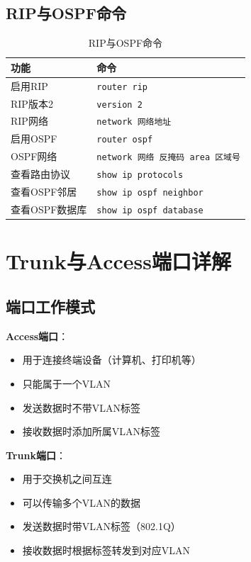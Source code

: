 \documentclass[12pt,a4paper]{ctexart}
\begin{document}
\subsection{RIP与OSPF命令}

\begin{table}[htbp]
\centering\small
\begin{tabular}{ll}
\toprule
\textbf{功能} & \textbf{命令} \\
\midrule
启用RIP & \texttt{router rip} \\
RIP版本2 & \texttt{version 2} \\
RIP网络 & \texttt{network 网络地址} \\
启用OSPF & \texttt{router ospf} \\
OSPF网络 & \texttt{network 网络 反掩码 area 区域号} \\
查看路由协议 & \texttt{show ip protocols} \\
查看OSPF邻居 & \texttt{show ip ospf neighbor} \\
查看OSPF数据库 & \texttt{show ip ospf database} \\
\bottomrule
\end{tabular}
\caption{RIP与OSPF命令}
\end{table}

\section{Trunk与Access端口详解}

\subsection{端口工作模式}

\begin{keybox}
\textbf{Access端口}：
\begin{itemize}[itemsep=0pt]
    \item 用于连接终端设备（计算机、打印机等）
    \item 只能属于一个VLAN
    \item 发送数据时不带VLAN标签
    \item 接收数据时添加所属VLAN标签
\end{itemize}

\textbf{Trunk端口}：
\begin{itemize}[itemsep=0pt]
    \item 用于交换机之间互连
    \item 可以传输多个VLAN的数据
    \item 发送数据时带VLAN标签（802.1Q）
    \item 接收数据时根据标签转发到对应VLAN
\end{itemize}
\end{keybox}
\end{document}
